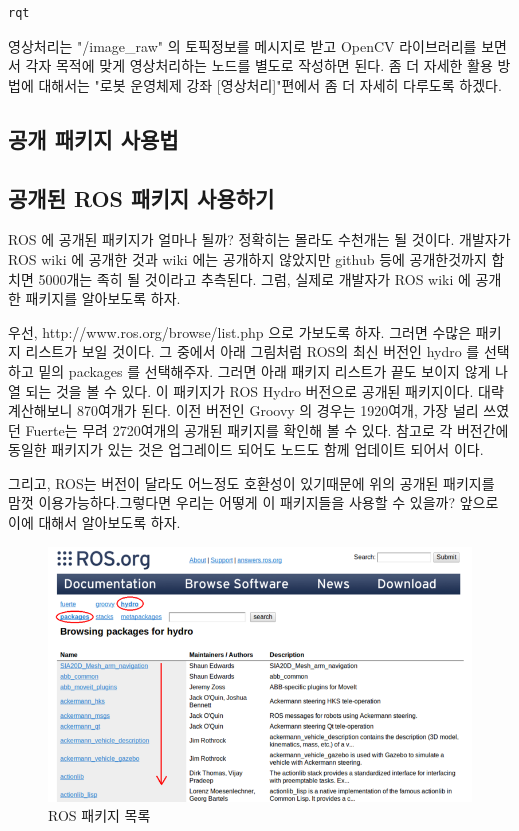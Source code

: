 \begin{lstlisting}[language=bash]
rqt
\end{lstlisting}

영상처리는 "/image\_raw" 의 토픽정보를 메시지로 받고 OpenCV 라이브러리를 보면서 각자 목적에 맞게 영상처리하는 노드를 별도로 작성하면 된다. 좀 더 자세한 활용 방법에 대해서는 "로봇 운영체제 강좌 [영상처리]"편에서 좀 더 자세히 다루도록 하겠다.

\subsection{공개 패키지 사용법}

\subsection{공개된 ROS 패키지 사용하기}

ROS 에 공개된 패키지가 얼마나 될까? 정확히는 몰라도 수천개는 될 것이다. 개발자가 ROS wiki 에 공개한 것과 wiki 에는 공개하지 않았지만 github 등에 공개한것까지 합치면 5000개는 족히 될 것이라고 추측된다. 그럼, 실제로 개발자가 ROS wiki 에 공개한 패키지를 알아보도록 하자.

우선, http://www.ros.org/browse/list.php 으로 가보도록 하자. 그러면 수많은 패키지 리스트가 보일 것이다. 그 중에서 아래 그림처럼 ROS의 최신 버전인 hydro 를 선택하고 밑의 packages 를 선택해주자. 그러면 아래 패키지 리스트가 끝도 보이지 않게 나열 되는 것을 볼 수 있다. 이 패키지가 ROS Hydro 버전으로 공개된 패키지이다. 대략 계산해보니  870여개가 된다. 이전 버전인 Groovy 의 경우는 1920여개, 가장 널리 쓰였던 Fuerte는 무려 2720여개의 공개된 패키지를 확인해 볼 수 있다. 참고로 각 버전간에 동일한 패키지가 있는 것은 업그레이드 되어도 노드도 함께 업데이트 되어서 이다.

그리고, ROS는 버전이 달라도 어느정도 호환성이 있기때문에 위의 공개된 패키지를 맘껏 이용가능하다.그렇다면 우리는 어떻게 이 패키지들을 사용할 수 있을까? 앞으로 이에 대해서 알아보도록 하자.

\begin{figure}[h]
\centering\includegraphics[width=0.9\columnwidth]{pictures/chapter8/openpkg1.png}
\caption{ROS 패키지 목록}
\end{figure}

